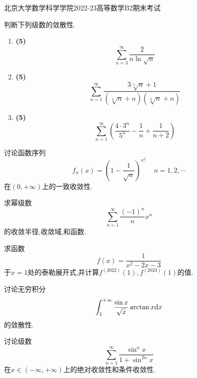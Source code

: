 \documentclass{ctexart}
\begin{document}
\pagestyle{empty}
\begin{center}\Large
    北京大学数学科学学院2022-23高等数学B2期末考试
\end{center}
\begin{problem}[1.(15\songti{分})]
    判断下列级数的敛散性.
    \begin{enumerate}[label=\tbf{(\arabic*)},topsep=0pt,parsep=0pt,itemsep=0pt,partopsep=0pt]
        \item \textbf{(5)}
            \[\sum_{n=3}^{\infty}\dfrac{2}{n\ln\sqrt{n}}\]
        \item \textbf{(5)}
            \[\sum_{n=1}^{\infty}\dfrac{3\sqrt[5]{n}+1}{\left(\sqrt[4]{n}+n\right)\left(\sqrt[3]{n}+n\right)}\]
        \item \textbf{(5)}
            \[\sum_{n=1}^{\infty}\left(\dfrac{4\cdot3^n}{5^n}-\dfrac{1}{n}+\dfrac{1}{n+2}\right)\]
    \end{enumerate}

\end{problem}

\begin{problem}[2.(10\songti{分})]
    讨论函数序列
    \[f_n(x)=\left(1-\dfrac{1}{\sqrt{n}}\right)^{x^2}\ \ \ \ \ n=1,2,\cdots\]
    在$(0,+\infty)$上的一致收敛性.

\end{problem}

\begin{problem}[3.(15\songti{分})]
    求幂级数
    \[\sum_{n=1}^{\infty}\dfrac{(-1)^n}{n}x^n\]
    的收敛半径,收敛域,和函数.

\end{problem}

\begin{problem}[4.(10\songti{分})]
    求函数
    \[f(x)=\dfrac{1}{x^2-2x-3}\]
    于$x=1$处的泰勒展开式,并计算$f^{(2022)}(1),f^{(2023)}(1)$的值.
        
\end{problem}

\begin{problem}[5.(10\songti{分})]
    讨论无穷积分
    \[\int_1^{+\infty}\dfrac{\sin x}{\sqrt{x}}\arctan x\mathrm{d} x\]
    的敛散性.
\end{problem}

\begin{problem}[6.(10\songti{分})]
    讨论级数
    \[\sum_{n=1}^{\infty}\dfrac{\sin^n x}{1+\sin^{2n}x}\]
    在$x\in(-\infty,+\infty)$上的绝对收敛性和条件收敛性.
\end{problem}
\end{document}
